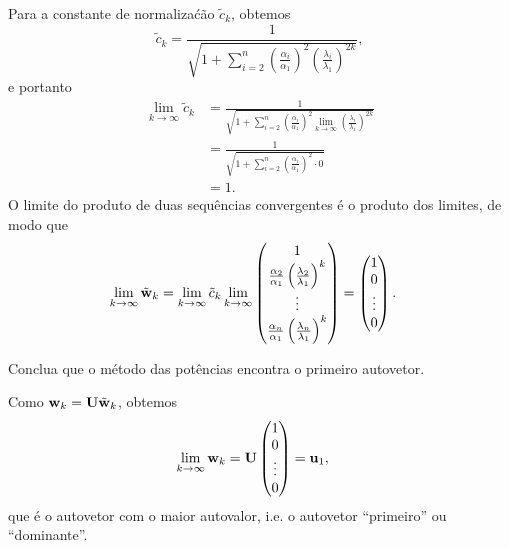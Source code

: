 \begin{exenumerate}
\begin{solution}
        Para a constante de normaliza\'c\~ao $\tilde{c}_k$, obtemos
        \begin{equation}
            \tilde{c}_k = \frac{1}{\sqrt{1 + \sum_{i=2}^n \left(\frac{\alpha_i}{\alpha_1}\right)^2 \left(\frac{\lambda_i}{\lambda_1}\right)^{2k}}},
        \end{equation}
        e portanto
        \begin{align}
            \lim_{k \rightarrow \infty} \tilde{c}_k &= \frac{1}{\sqrt{1 + \sum_{i=2}^n \left(\frac{\alpha_i}{\alpha_1}\right)^2 \underset{k \rightarrow \infty}
                    {\lim}\left(\frac{\lambda_i}{\lambda_1}\right)^{2k}}} \\
            &= \frac{1}{\sqrt{1 + \sum_{i=2}^n \left(\frac{\alpha_i}{\alpha_1}\right)^2 \cdot 0}} \\
            &= 1.
        \end{align}
        O limite do produto de duas sequ\^encias convergentes \'e o produto dos limites, de modo que 
        \begin{align}
            \lim_{k \rightarrow \infty} \tilde{\mathbf{w}}_k &= \lim_{k \rightarrow \infty} \tilde{c}_k 
            \lim_{k \rightarrow \infty} \begin{pmatrix}
                1 \\
                \frac{\alpha_2}{\alpha_1}\left(\frac{\lambda_2}{\lambda_1}\right)^k \\
                \vdots \\
                \frac{\alpha_n}{\alpha_1}\left(\frac{\lambda_n}{\lambda_1}\right)^k 
            \end{pmatrix}
            = 
            \begin{pmatrix} 
                1 \\ 
                0 \\ 
                \vdots \\ 
                0 
            \end{pmatrix}.
        \end{align}
        
    \end{solution}
    \item Conclua que o m\'etodo das pot\^encias encontra o primeiro autovetor.
    
    \begin{solution}
        Como $\mathbf{w}_k = \mathbf{U}\tilde{\mathbf{w}}_k$, obtemos
        \begin{align}
            \lim_{k \rightarrow \infty} \mathbf{w}_k &= \mathbf{U} 
            \begin{pmatrix}
                1 \\
                0 \\
                \vdots \\
                0
            \end{pmatrix}
            = \mathbf{u}_1,
        \end{align}
        que \'e o autovetor com o maior autovalor, i.e. o autovetor ``primeiro'' ou ``dominante''. 
    \end{solution}
    
\end{exenumerate}